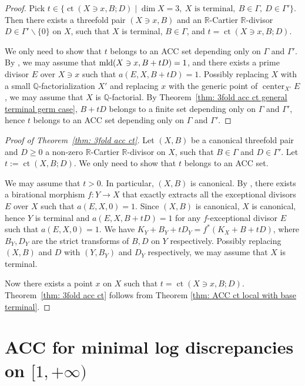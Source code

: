 \documentclass[11pt]{amsart}
\numberwithin{equation}{section}
\newcommand\han[1]{\todo[color=yellow!40]{#1}} %
\newcommand{\Qq}{\mathbb{Q}}
\newcommand{\Rr}{\mathbb{R}}
\newcommand{\Center}{\operatorname{center}}
\newcommand{\mld}{{\rm{mld}}}
\newcommand{\ct}{\operatorname{ct}}
\newcommand{\Ii}{{\Gamma}}
\theoremstyle{definition}
\theoremstyle{definition}
\begin{document}
\begin{proof}
Pick $t\in\{\ct(X\ni x, B;D)\mid \dim X=3,~X \text{ is terminal},~B\in \Ii,~D\in \Ii'\}$. Then there exists a threefold pair $(X\ni x,B)$ and an $\Rr$-Cartier $\Rr$-divisor $D\in\Ii'\backslash\{0\}$ on $X$, such that $X$ is terminal, $B\in\Ii$, and $t=\ct(X\ni x, B;D)$. 

We only need to show that $t$ belongs to an ACC set depending only on $\Ii$ and $\Ii'$. By \cite[Theorem 1.1]{HMX14}, we may assume that $\mld(X\ni x,B+tD)=1$, and there exists a prime divisor $E$ over $X\ni x$ such that $a(E,X,B+tD)=1$. Possibly replacing $X$ with a small $\Qq$-factorialization $X'$ and replacing $x$ with the generic point of $\Center_{X'}E$, we may assume that $X$ is $\Qq$-factorial. By Theorem~\ref{thm: 3fold acc ct general terminal germ case}, $B+tD$ belongs to a finite set depending only on $\Ii$ and $\Ii'$, hence $t$ belongs to an ACC set depending only on $\Ii$ and $\Ii'$.
\end{proof}



\begin{proof}[Proof of Theorem~\ref{thm: 3fold acc ct}] 
Let $(X,B)$ be a canonical threefold pair and $D\geq 0$ a non-zero $\Rr$-Cartier $\Rr$-divisor on $X$, such that $B\in \Ii$ and $D\in\Ii'$. Let $t:=\ct(X,B;D)$. We only need to show that $t$ belongs to an ACC set.

We may assume that $t>0$. In particular, $(X,B)$ is canonical. By \cite[Corollary~1.4.3]{BCHM10}, there exists a birational morphism $f: Y\to X$ that exactly extracts all the exceptional divisors $E$ over $X$ such that $a(E,X,0)=1$. Since $(X,B)$ is canonical, $X$ is canonical, hence $Y$ is terminal and $a(E,X,B+tD)=1$ for any $f$-exceptional divisor $E$ such that $a(E,X,0)=1$. We have $K_Y+B_Y+tD_Y=f^*(K_X+B+tD)$, where $B_Y,D_Y$ are the strict transforms of $B,D$ on $Y$ respectively. Possibly replacing $(X,B)$ and $D$ with $(Y,B_Y)$ and $D_Y$ respectively, we may assume that $X$ is terminal.

Now there exists a point $x$ on $X$ such that $t=\ct(X\ni x,B;D)$. Theorem~\ref{thm: 3fold acc ct} follows from Theorem \ref{thm: ACC ct local with base terminal}.
\end{proof}



\section{ACC for minimal log discrepancies on \texorpdfstring{$[1,+\infty)$}{Lg}}\label{section: ACC for minimal log discrepancies on 1,oo}
\end{document}
